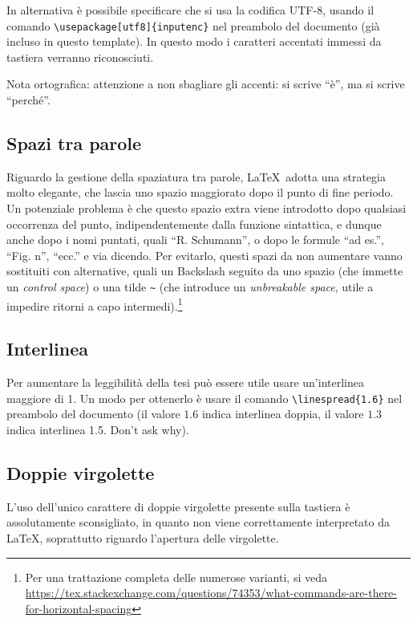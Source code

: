 In alternativa \`e possibile specificare che si usa la codifica UTF-8, usando il comando \verb|\usepackage[utf8]{inputenc}| nel preambolo del documento (già incluso in questo template). In questo modo i caratteri accentati immessi da tastiera verranno riconosciuti.

Nota ortografica: attenzione a non sbagliare gli accenti: si scrive ``\`e'', ma si scrive ``perch\'e''.

\subsection{Spazi tra parole}

Riguardo la gestione della spaziatura tra parole, \LaTeX\ adotta una strategia molto elegante, che lascia uno spazio maggiorato dopo il punto di fine periodo. Un potenziale problema è che questo spazio extra viene introdotto dopo qualsiasi occorrenza del punto, indipendentemente dalla funzione sintattica, e dunque anche dopo i nomi puntati, quali ``R. Schumann'', o dopo le formule ``ad es.'', ``Fig. n'', ``ecc.'' e via dicendo. Per evitarlo, questi spazi da non aumentare vanno sostituiti con alternative, quali un Backslash seguito da uno spazio (che immette un \textit{control space}) o una tilde \verb|~| (che introduce un \textit{unbreakable space}, utile a impedire ritorni a capo intermedi).\footnote{Per una trattazione completa delle numerose varianti, si veda \url{https://tex.stackexchange.com/questions/74353/what-commands-are-there-for-horizontal-spacing}}

\subsection{Interlinea}

Per aumentare la leggibilit\`a della tesi pu\`o essere utile usare un'interlinea maggiore di 1. Un modo per ottenerlo \`e usare il comando \verb|\linespread{1.6}| nel preambolo del documento (il valore $1.6$ indica interlinea doppia, il valore $1.3$ indica interlinea 1.5. Don't ask why).


\subsection{Doppie virgolette}

L'uso dell'unico carattere di doppie virgolette presente sulla tastiera è assolutamente sconsigliato, in quanto non viene correttamente interpretato da \LaTeX, soprattutto riguardo l'apertura delle virgolette.


